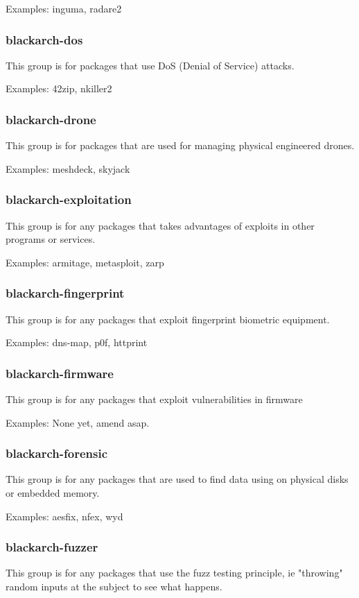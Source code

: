 \documentclass[a4paper, oneside, 11pt]{book}
\begin{document}
Examples: inguma, radare2

\subsubsection{blackarch-dos}
This group is for packages that use DoS (Denial of Service) attacks.

Examples: 42zip, nkiller2

\subsubsection{blackarch-drone}
This group is for packages that are used for managing physical engineered
drones.

Examples: meshdeck, skyjack

\subsubsection{blackarch-exploitation}
This group is for any packages that takes advantages of exploits in other
programs or services.

Examples: armitage, metasploit, zarp

\subsubsection{blackarch-fingerprint}
This group is for any packages that exploit fingerprint biometric equipment.

Examples: dns-map, p0f, httprint

\subsubsection{blackarch-firmware}
This group is for any packages that exploit vulnerabilities in firmware

Examples: None yet, amend asap.

\subsubsection{blackarch-forensic}
This group is for any packages that are used to find data using on physical
disks or embedded memory.

Examples: aesfix, nfex, wyd

\subsubsection{blackarch-fuzzer}
This group is for any packages that use the fuzz testing principle, ie
"throwing" random inputs at the subject to see what happens.
\end{document}
